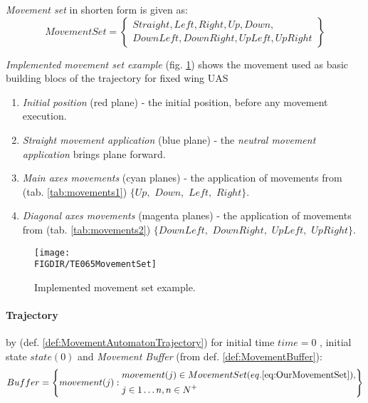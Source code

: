 \begin{note}
    \emph{Movement set} in shorten form is given as:
    \begin{equation}\label{eq:OurMovementSet}
        Movement Set= \left\{
        \begin{gathered}
            Straight, Left,Right, Up, Down,\\
            Down Left, Down Right,  Up Left,   Up Right
        \end{gathered}
        \right\}
    \end{equation}
\end{note}

\emph{Implemented movement set example} (fig. \ref{fig:implementedMovementSetExample}) shows the movement used as basic building blocs of the trajectory for fixed wing UAS
\begin{enumerate}
    \item \emph{Initial position} (red plane) - the initial position, before any movement execution.
    
    \item \emph{Straight movement application} (blue plane) - the \emph{neutral movement application} brings plane forward. 
    
    \item \emph{Main axes movements} (cyan planes) - the application of movements from (tab. \ref{tab:movements1}) $\{Up,$ $Down,$ $Left,$ $Right\}$.
    
    \item \emph{Diagonal axes movements} (magenta planes) - the application of movements from (tab. \ref{tab:movements2}) $\{Down Left,$ $Down Right,$  $Up Left,$   $Up Right\}$.
 \end{enumerate}
\begin{figure}[H]
    \centering
    \texttt{[image: \\FIGDIR/TE065MovementSet]}
    \caption{Implemented movement set example.}
    \label{fig:implementedMovementSetExample}
\end{figure}

\paragraph{Trajectory} by (def. \ref{def:MovementAutomatonTrajectory}) for initial time $time = 0$ , initial state $state(0)$ and \emph{Movement Buffer} (from def. \ref{def:MovementBuffer}):
\begin{equation}\label{eq:ourBuffer}
    Buffer = \left\{
                movement(j):
                \begin{aligned}
                    &movement(j)\in Movement Set (eq. \ref{eq:OurMovementSet}),\\
                    & j \in 1\dots n, n \in N^+
                \end{aligned}
            \right\}
\end{equation}

